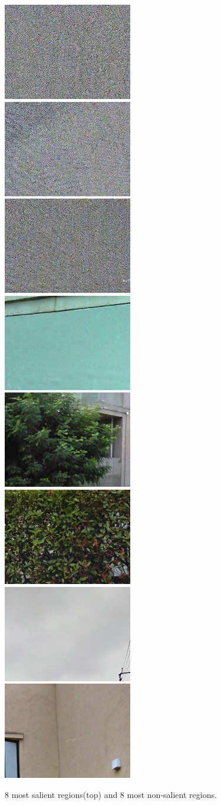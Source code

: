 \begin{figure}
\includegraphics[width=0.2\linewidth]{img/nonsal_1}
\includegraphics[width=0.2\linewidth]{img/nonsal_2}
\includegraphics[width=0.2\linewidth]{img/nonsal_3}
\includegraphics[width=0.2\linewidth]{img/nonsal_4}
\\[0.1cm]
\includegraphics[width=0.2\linewidth]{img/nonsal_5}
\includegraphics[width=0.2\linewidth]{img/nonsal_6}
\includegraphics[width=0.2\linewidth]{img/nonsal_7}
\includegraphics[width=0.2\linewidth]{img/nonsal_8}
\\
\caption{8 most salient regions(top) and 8 most non-salient regions.}
\label{fig:saliency}
\end{figure}

